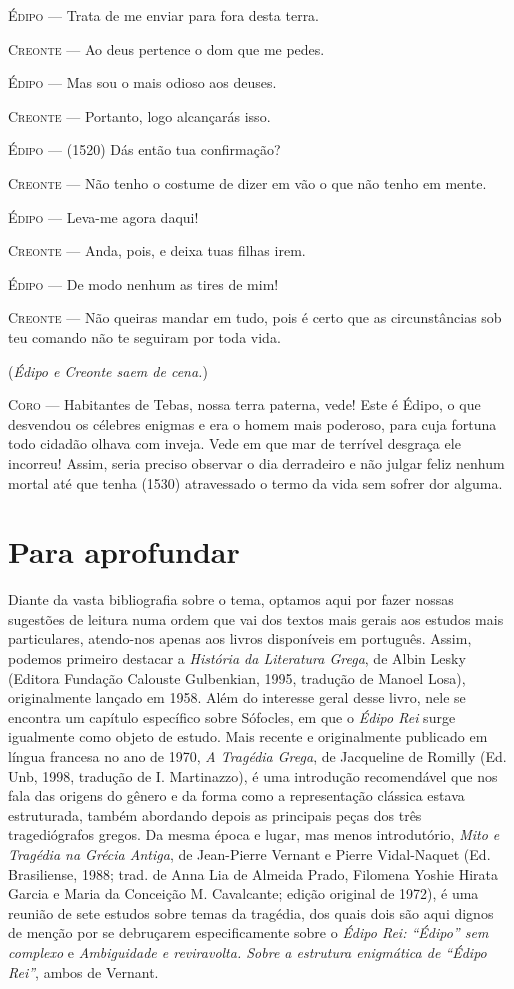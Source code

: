 \textsc{Édipo} --- Trata de me enviar para fora desta terra.

\textsc{Creonte} --- Ao deus pertence o dom que me pedes.

\textsc{Édipo} --- Mas sou o mais odioso aos deuses.

\textsc{Creonte} --- Portanto, logo alcançarás isso.

\textsc{Édipo} --- (1520) Dás então tua confirmação?

\textsc{Creonte} --- Não tenho o costume de dizer em vão o que não tenho em mente.

\textsc{Édipo} --- Leva-me agora daqui!

\textsc{Creonte} --- Anda, pois, e deixa tuas filhas irem.

\textsc{Édipo} --- De modo nenhum as tires de mim!

\textsc{Creonte} --- Não queiras mandar em tudo, pois é certo que as circunstâncias sob teu
comando não te seguiram por toda vida.

(\emph{Édipo e Creonte saem de cena.})

\textsc{Coro} --- Habitantes de Tebas, nossa terra paterna, vede! Este é Édipo, o que
desvendou os célebres enigmas e era o homem mais poderoso, para cuja
fortuna todo cidadão olhava com inveja. Vede em que mar de terrível
desgraça ele incorreu! Assim, seria preciso observar o dia derradeiro e
não julgar feliz nenhum mortal até que tenha (1530) atravessado o termo
da vida sem sofrer dor alguma.

\chapter{Para aprofundar}

Diante da vasta bibliografia sobre o tema, optamos aqui por fazer nossas
sugestões de leitura numa ordem que vai dos textos mais gerais aos
estudos mais particulares, atendo-nos apenas aos livros disponíveis em
português. Assim, podemos primeiro destacar a \emph{História da
Literatura Grega}, de Albin Lesky (Editora Fundação Calouste
Gulbenkian, 1995, tradução de Manoel Losa), originalmente lançado em
1958. Além do interesse geral desse livro, nele se encontra um capítulo
específico sobre Sófocles, em que o \emph{Édipo Rei} surge igualmente
como objeto de estudo. Mais recente e originalmente publicado em língua
francesa no ano de 1970, \emph{A Tragédia Grega}, de Jacqueline
de Romilly (Ed. Unb, 1998, tradução de I. Martinazzo), é uma introdução
recomendável que nos fala das origens do gênero e da forma como a
representação clássica estava estruturada, também abordando depois as
principais peças dos três tragediógrafos gregos. Da mesma época e lugar,
mas menos introdutório, \emph{Mito e Tragédia na Grécia
Antiga}, de Jean-Pierre Vernant e Pierre Vidal-Naquet (Ed. Brasiliense,
1988; trad. de Anna Lia de Almeida Prado, Filomena Yoshie Hirata Garcia
e Maria da Conceição M. Cavalcante; edição original de 1972), é uma
reunião de sete estudos sobre temas da tragédia, dos quais dois são aqui
dignos de menção por se debruçarem especificamente sobre o \emph{Édipo
Rei: ``Édipo'' sem complexo} e \emph{Ambiguidade e reviravolta.
Sobre a estrutura enigmática de ``Édipo Rei''}, ambos de Vernant.

